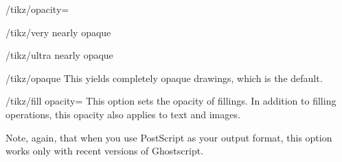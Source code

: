 \begin{key}{/tikz/opacity=}
  \begin{stylekey}{/tikz/very nearly opaque}
\begin{codeexample}[]
\end{codeexample}
  \end{stylekey}

  \begin{stylekey}{/tikz/ultra nearly opaque}
\begin{codeexample}[]
\end{codeexample}
  \end{stylekey}

  \begin{stylekey}{/tikz/opaque}
    This yields completely opaque drawings, which is the default.
\begin{codeexample}[]
\end{codeexample}
  \end{stylekey}
\end{key}


\begin{key}{/tikz/fill opacity=}
  This option sets the opacity of fillings. In addition to filling
  operations, this opacity also applies to text and images.

  Note, again, that when you use PostScript as your output format,
  this option works only with recent versions of Ghostscript.

\begin{codeexample}[]
\end{codeexample}

\begin{codeexample}[]
\end{codeexample}
\end{key}

